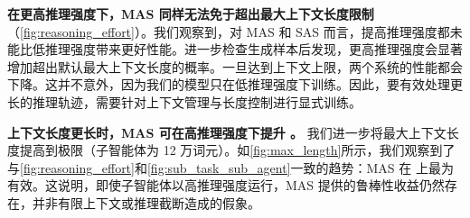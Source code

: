


\textbf{在更高推理强度下，MAS 同样无法免于超出最大上下文长度限制}（\cref{fig:reasoning_effort}）。我们观察到，对 MAS 和 SAS 而言，提高推理强度都未能比低推理强度带来更好性能。进一步检查生成样本后发现，更高推理强度会显著增加超出默认最大上下文长度的概率。一旦达到上下文上限，两个系统的性能都会下降。这并不意外，因为我们的模型只在低推理强度下训练。因此，要有效处理更长的推理轨迹，需要针对上下文管理与长度控制进行显式训练。



\textbf{上下文长度更长时，MAS 可在高推理强度下提升 \robustness。}
我们进一步将最大上下文长度提高到极限（\ossonetwenty 子智能体为 12 万词元）。如\cref{fig:max_length}所示，我们观察到了与\cref{fig:reasoning_effort}和\cref{fig:sub_task_sub_agent}一致的趋势：MAS 在 \robustness 上最为有效。这说明，即使子智能体以高推理强度运行，MAS 提供的鲁棒性收益仍然存在，并非有限上下文或推理截断造成的假象。

